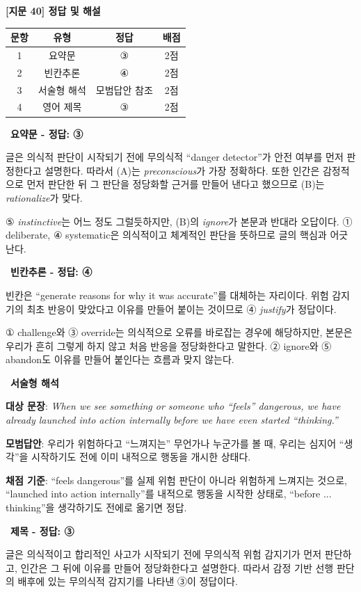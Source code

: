 \documentclass[11pt,a4paper]{article}
\newcommand{\qno}[1]{\par\vspace{10pt}{\sffamily\bfseries #1.}\ }
\begin{document}
\begin{center}
{\fontsize{15}{17}\selectfont\sffamily\bfseries [지문 40] 정답 및 해설}
\end{center}
\vspace{6pt}
\begin{center}
\renewcommand{\arraystretch}{1.35}
\begin{tabular}{cccc}
\toprule
문항 & 유형 & 정답 & 배점 \\
\midrule
1 & 요약문 & ③ & 2점 \\
2 & 빈칸추론 & ④ & 2점 \\
3 & 서술형 해석 & 모범답안 참조 & 2점 \\
4 & 영어 제목 & ③ & 2점 \\
\bottomrule
\end{tabular}
\end{center}

\qno{1}\textbf{요약문 - 정답: ③}
\begin{pbox}
글은 의식적 판단이 시작되기 전에 무의식적 ``danger detector''가 안전 여부를 먼저 판정한다고 설명한다. 따라서 (A)는 \textit{preconscious}가 가장 정확하다. 또한 인간은 감정적으로 먼저 판단한 뒤 그 판단을 정당화할 근거를 만들어 낸다고 했으므로 (B)는 \textit{rationalize}가 맞다.

\medskip
⑤ \textit{instinctive}는 어느 정도 그럴듯하지만, (B)의 \textit{ignore}가 본문과 반대라 오답이다. ① deliberate, ④ systematic은 의식적이고 체계적인 판단을 뜻하므로 글의 핵심과 어긋난다.
\end{pbox}

\qno{2}\textbf{빈칸추론 - 정답: ④}
\begin{pbox}
빈칸은 ``generate reasons for why it was accurate''를 대체하는 자리이다. 위험 감지기의 최초 반응이 맞았다고 이유를 만들어 붙이는 것이므로 ④ \textit{justify}가 정답이다.

\medskip
① challenge와 ③ override는 의식적으로 오류를 바로잡는 경우에 해당하지만, 본문은 우리가 흔히 그렇게 하지 않고 처음 반응을 정당화한다고 말한다. ② ignore와 ⑤ abandon도 이유를 만들어 붙인다는 흐름과 맞지 않는다.
\end{pbox}

\qno{3}\textbf{서술형 해석}
\begin{pbox}
\textbf{대상 문장}: \textit{When we see something or someone who ``feels'' dangerous, we have already launched into action internally before we have even started ``thinking.''}

\medskip
\textbf{모범답안}: 우리가 위험하다고 ``느껴지는'' 무언가나 누군가를 볼 때, 우리는 심지어 ``생각''을 시작하기도 전에 이미 내적으로 행동을 개시한 상태다.

\medskip
\textbf{채점 기준}: ``feels dangerous''를 실제 위험 판단이 아니라 위험하게 느껴지는 것으로, ``launched into action internally''를 내적으로 행동을 시작한 상태로, ``before ... thinking''을 생각하기도 전에로 옮기면 정답.
\end{pbox}
\vspace{8pt}
\qno{4}\textbf{제목 - 정답: ③}
\begin{pbox}
글은 의식적이고 합리적인 사고가 시작되기 전에 무의식적 위험 감지기가 먼저 판단하고, 인간은 그 뒤에 이유를 만들어 정당화한다고 설명한다. 따라서 감정 기반 선행 판단의 배후에 있는 무의식적 감지기를 나타낸 ③이 정답이다.
\end{pbox}
\end{document}
